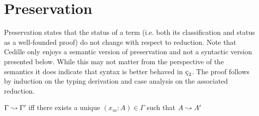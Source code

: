 \section{Preservation}

Preservation states that the status of a term (i.e. both its classification and status as a well-founded proof) do not change with respect to reduction.
Note that Cedille only enjoys a semantic version of preservation and not a syntactic version presented below.
While this may not matter from the perspective of the semantics it does indicate that syntax is better behaved in $\ced$.
The proof follows by induction on the typing derivation and case analysis on the associated reduction.

\begin{definition}
    $\Gamma \leadsto \Gamma^\prime$ iff there exists a unique $(x_m : A) \in \Gamma$ such that $A \leadsto A^\prime$
\end{definition}

